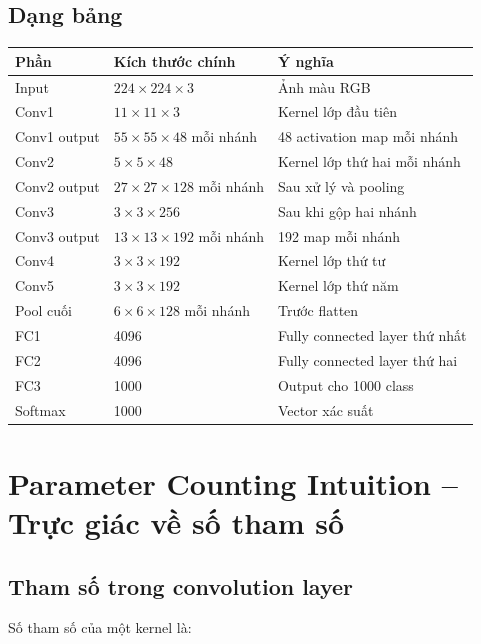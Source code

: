 \subsection{Dạng bảng}

\begin{center}
\begin{tabular}{p{}p{}p{}}
\toprule
Phần & Kích thước chính & Ý nghĩa \\
\midrule
Input & $224\times224\times3$ & Ảnh màu RGB \\
Conv1 & $11\times11\times3$ & Kernel lớp đầu tiên \\
Conv1 output & $55\times55\times48$ mỗi nhánh & 48 activation map mỗi nhánh \\
Conv2 & $5\times5\times48$ & Kernel lớp thứ hai mỗi nhánh \\
Conv2 output & $27\times27\times128$ mỗi nhánh & Sau xử lý và pooling \\
Conv3 & $3\times3\times256$ & Sau khi gộp hai nhánh \\
Conv3 output & $13\times13\times192$ mỗi nhánh & 192 map mỗi nhánh \\
Conv4 & $3\times3\times192$ & Kernel lớp thứ tư \\
Conv5 & $3\times3\times192$ & Kernel lớp thứ năm \\
Pool cuối & $6\times6\times128$ mỗi nhánh & Trước flatten \\
FC1 & 4096 & Fully connected layer thứ nhất \\
FC2 & 4096 & Fully connected layer thứ hai \\
FC3 & 1000 & Output cho 1000 class \\
Softmax & 1000 & Vector xác suất \\
\bottomrule
\end{tabular}
\end{center}

\section{Parameter Counting Intuition -- Trực giác về số tham số}

\subsection{Tham số trong convolution layer}

Số tham số của một kernel là:

